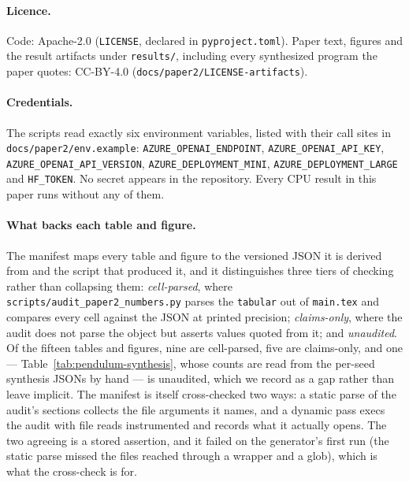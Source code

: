 \paragraph{Licence.} Code: Apache-2.0 (\texttt{LICENSE}, declared in
\texttt{pyproject.toml}). Paper text, figures and the result artifacts under
\texttt{results/}, including every synthesized program the paper quotes: CC-BY-4.0
(\texttt{docs/\allowbreak paper2/\allowbreak LICENSE-artifacts}).

\paragraph{Credentials.} The scripts read exactly six environment variables, listed with
their call sites in \texttt{docs/\allowbreak paper2/\allowbreak env.\allowbreak example}: \texttt{AZURE\_\allowbreak OPENAI\_\allowbreak ENDPOINT},
\texttt{AZURE\_\allowbreak OPENAI\_\allowbreak API\_\allowbreak KEY}, \texttt{AZURE\_\allowbreak OPENAI\_\allowbreak API\_\allowbreak VERSION},
\texttt{AZURE\_\allowbreak DEPLOYMENT\_\allowbreak MINI}, \texttt{AZURE\_\allowbreak DEPLOYMENT\_\allowbreak LARGE} and \texttt{HF\_TOKEN}.
No secret appears in the repository. Every CPU result in this paper runs without any of them.

\paragraph{What backs each table and figure.} The manifest maps every table and figure to
the versioned JSON it is derived from and the script that produced it, and it distinguishes
three tiers of checking rather than collapsing them: \emph{cell-parsed}, where
\texttt{scripts/\allowbreak audit\_\allowbreak paper2\_\allowbreak numbers.py} parses the
\texttt{tabular} out of \texttt{main.tex} and compares every cell against the JSON at
printed precision; \emph{claims-only}, where the audit does not parse the object but asserts
values quoted from it; and \emph{unaudited}. Of the fifteen tables and figures, nine are
cell-parsed, five are claims-only, and one --- Table~\ref{tab:pendulum-synthesis}, whose
counts are read from the per-seed synthesis JSONs by hand --- is unaudited, which we record
as a gap rather than leave implicit. The manifest is itself cross-checked two ways: a static
parse of the audit's sections collects the file arguments it names, and a dynamic pass execs
the audit with file reads instrumented and records what it actually opens. The two agreeing
is a stored assertion, and it failed on the generator's first run (the static parse missed
the files reached through a wrapper and a glob), which is what the cross-check is for.

